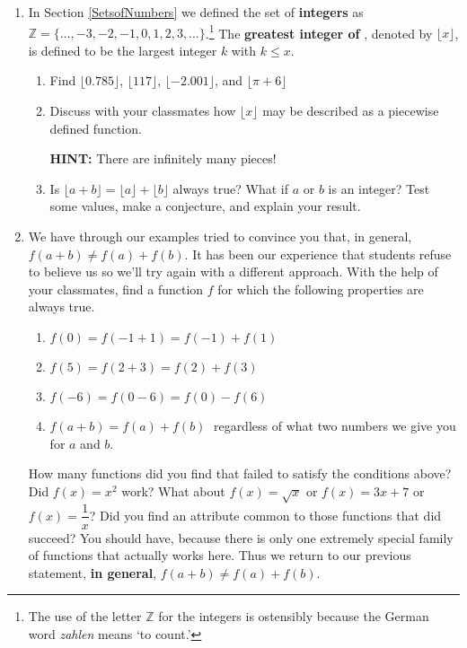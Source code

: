 {\begin{enumerate}
\begin{enumerate}
\end{enumerate}


\item  \label{greatestinteger} In Section \ref{SetsofNumbers} we defined the set of \textbf{integers} as  $\mathbb{Z} = \{ \ldots, -3, -2, -1, 0, 1, 2, 3, \ldots\}$.\footnote{The use of the letter $\mathbb{Z}$ for the integers is ostensibly because the German word \textit{zahlen} means `to count.'}  The \textbf{greatest integer of }, denoted by $\lfloor x \rfloor$, is defined to be the largest integer $k$ with $k \leq x$.

\begin{enumerate}

\item  Find $\lfloor 0.785 \rfloor$, $\lfloor 117 \rfloor$, $\lfloor -2.001 \rfloor$, and $\lfloor \pi + 6 \rfloor$

\item  Discuss with your classmates how $\lfloor x \rfloor$ may be described as a piecewise defined function.

\smallskip

\textbf{HINT:}  There are infinitely many pieces!

\item  Is $\lfloor a + b \rfloor = \lfloor a \rfloor + \lfloor b \rfloor$ always true?  What if $a$ or $b$ is an integer?  Test some values, make a conjecture, and explain your result.

\end{enumerate}

\item We have through our examples tried to convince you that, in general, $f(a + b) \neq f(a) + f(b)$.  It has been our experience that students refuse to believe us so we'll try again with a different approach.  With the help of your classmates, find a function $f$ for which the following properties are always true.

\begin{enumerate}

\item $f(0) = f(-1 + 1) = f(-1) + f(1)$
\item $f(5) = f(2 + 3) = f(2) + f(3)$
\item $f(-6) = f(0 - 6) = f(0) - f(6)$
\item $f(a + b) = f(a) + f(b)\;$ regardless of what two numbers we give you for $a$ and  $b$.

\end{enumerate}

How many functions did you find that failed to satisfy the conditions above?  Did $f(x) = x^{2}$ work?  What about $f(x) = \sqrt{x}$ or $f(x) = 3x + 7$ or $f(x) = \dfrac{1}{x}$?  Did you find an attribute common to those functions that did succeed?  You should have, because there is only one extremely special family of functions that actually works here.  Thus we return to our previous statement, {\bf in general}, $f(a + b) \neq f(a) + f(b)$.

\end{enumerate}
} %
